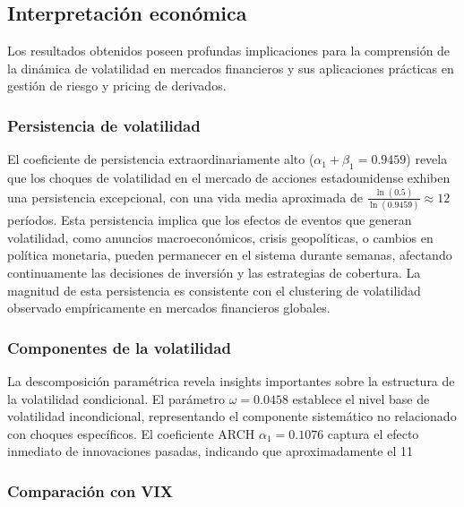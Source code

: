 \subsection{Interpretación económica}

Los resultados obtenidos poseen profundas implicaciones para la comprensión de la dinámica de volatilidad en mercados financieros y sus aplicaciones prácticas en gestión de riesgo y pricing de derivados.

\subsubsection{Persistencia de volatilidad}

El coeficiente de persistencia extraordinariamente alto ($\alpha_1 + \beta_1 = 0.9459$) revela que los choques de volatilidad en el mercado de acciones estadounidense exhiben una persistencia excepcional, con una vida media aproximada de $\frac{\ln(0.5)}{\ln(0.9459)} \approx 12$ períodos. Esta persistencia implica que los efectos de eventos que generan volatilidad, como anuncios macroeconómicos, crisis geopolíticas, o cambios en política monetaria, pueden permanecer en el sistema durante semanas, afectando continuamente las decisiones de inversión y las estrategias de cobertura. La magnitud de esta persistencia es consistente con el clustering de volatilidad observado empíricamente en mercados financieros globales.

\subsubsection{Componentes de la volatilidad}

La descomposición paramétrica revela insights importantes sobre la estructura de la volatilidad condicional. El parámetro $\omega = 0.0458$ establece el nivel base de volatilidad incondicional, representando el componente sistemático no relacionado con choques específicos. El coeficiente ARCH $\alpha_1 = 0.1076$ captura el efecto inmediato de innovaciones pasadas, indicando que aproximadamente el 11%

\subsubsection{Comparación con VIX}

